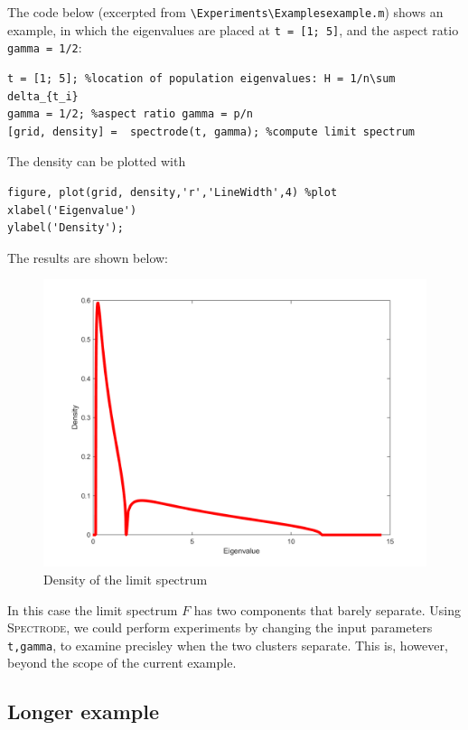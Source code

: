 \documentclass[english,11pt]{article} %
\begin{document}
The code below (excerpted from \verb+\Experiments\Examplesexample.m+) shows an example, in which the eigenvalues are placed at \verb+t = [1; 5]+, and the aspect ratio \verb+gamma = 1/2+:


\begin{verbatim}
t = [1; 5]; %location of population eigenvalues: H = 1/n\sum delta_{t_i}
gamma = 1/2; %aspect ratio gamma = p/n
[grid, density] =  spectrode(t, gamma); %compute limit spectrum
\end{verbatim}

The density can be plotted with 

\begin{verbatim}
figure, plot(grid, density,'r','LineWidth',4) %plot
xlabel('Eigenvalue')
ylabel('Density');
\end{verbatim}

The results are shown below:

\begin{figure}[ht!]
\centering
\includegraphics[scale=0.5]{"../Experiments/Examples/quick_example"}
\caption{Density of the limit spectrum}
\label{scatter_prior_current}
\end{figure}

In this case the limit spectrum $F$ has two components that barely separate. Using \textsc{Spectrode}, we could perform experiments by changing the input parameters \verb+t,gamma+, to examine precisley when the two clusters separate. This is, however, beyond the scope of the current example.

\subsection{Longer example}
\end{document}
